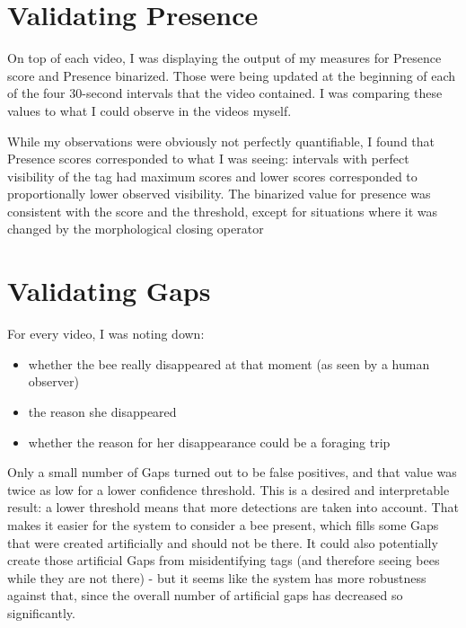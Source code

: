 \section{Validating Presence}

On top of each video, I was displaying the output of my measures for Presence score and Presence binarized. Those were being updated at the beginning of each of the four 30-second intervals that the video contained. I was comparing these values to what I could observe in the videos myself. 

While my observations were obviously not perfectly quantifiable, I found that Presence scores corresponded to what I was seeing: intervals with perfect visibility of the tag had maximum scores and lower scores corresponded to proportionally lower observed visibility. The binarized value for presence was consistent with the score and the threshold, except for situations where it was changed by the morphological closing operator 


\section{Validating Gaps}


For every video, I was noting down:

\begin{itemize}
\item whether the bee really disappeared at that moment (as seen by a human observer)
\item the reason she disappeared 
\item whether the reason for her disappearance could be a foraging trip
\end{itemize}

Only a small number of Gaps turned out to be false positives, and that value was twice as low for a lower confidence threshold. This is a desired and interpretable result: a lower threshold means that more detections are taken into account. That makes it easier for the system to consider a bee present, which fills some Gaps that were created artificially and should not be there. It could also potentially create those artificial Gaps from misidentifying tags (and therefore seeing bees while they are not there) - but it seems like the system has more robustness against that, since the overall number of artificial gaps has decreased so significantly.

